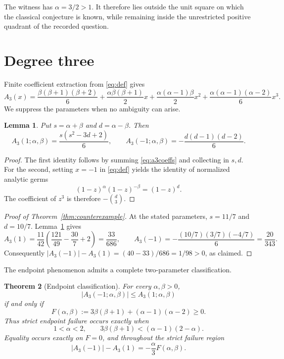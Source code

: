 \documentclass[a4paper]{amsart}
\newtheorem{theorem}{Theorem}[section]
\newtheorem{lemma}[theorem]{Lemma}
\theoremstyle{remark}
\begin{document}
The witness has \(\alpha=3/2>1\).  It therefore lies outside the unit square on which the classical conjecture is known, while remaining inside the unrestricted positive quadrant of the recorded question.

\section{Degree three}

Finite coefficient extraction from \eqref{eq:def} gives
\begin{equation}\label{eq:a3coeffs}
 A_3(x)=
 \frac{\beta(\beta+1)(\beta+2)}6
 +\frac{\alpha\beta(\beta+1)}2x
 +\frac{\alpha(\alpha-1)\beta}2x^2
 +\frac{\alpha(\alpha-1)(\alpha-2)}6x^3.
\end{equation}
We suppress the parameters when no ambiguity can arise.

\begin{lemma}\label{lem:sdforms}
Put \(s=\alpha+\beta\) and \(d=\alpha-\beta\).  Then
\[
 A_3(1;\alpha,\beta)=\frac{s(s^2-3d+2)}6,
 \qquad
 A_3(-1;\alpha,\beta)=-\frac{d(d-1)(d-2)}6.
\]
\end{lemma}

\begin{proof}
The first identity follows by summing \eqref{eq:a3coeffs} and collecting in \(s,d\).
For the second, setting \(x=-1\) in \eqref{eq:def} yields the identity of normalized analytic germs
\[
 (1-z)^\alpha(1-z)^{-\beta}=(1-z)^d.
\]
The coefficient of \(z^3\) is therefore \(-\binom d3\).
\end{proof}

\begin{proof}[Proof of Theorem~\ref{thm:counterexample}]
At the stated parameters, \(s=11/7\) and \(d=10/7\).  Lemma~\ref{lem:sdforms} gives
\[
 A_3(1)=\frac{11}{42}\left(\frac{121}{49}-\frac{30}{7}+2\right)
 =\frac{33}{686},
 \qquad
 A_3(-1)=-\frac{(10/7)(3/7)(-4/7)}6=\frac{20}{343}.
\]
Consequently
\(
 \lvert A_3(-1)\rvert-A_3(1)=(40-33)/686=1/98>0
\), as claimed.
\end{proof}

The endpoint phenomenon admits a complete two-parameter classification.

\begin{theorem}[Endpoint classification]\label{thm:endpoint}
For every \(\alpha,\beta>0\),
\[
 \lvert A_3(-1;\alpha,\beta)\rvert\leq A_3(1;\alpha,\beta)
\]
if and only if
\begin{equation}\label{eq:F}
 F(\alpha,\beta):=3\beta(\beta+1)+(\alpha-1)(\alpha-2)\geq0.
\end{equation}
Thus strict endpoint failure occurs exactly when
\[
 1<\alpha<2,
 \qquad
 3\beta(\beta+1)<(\alpha-1)(2-\alpha).
\]
Equality occurs exactly on \(F=0\), and throughout the strict failure region
\begin{equation}\label{eq:gap}
 \lvert A_3(-1)\rvert-A_3(1)=-\frac{\alpha}{3}F(\alpha,\beta).
\end{equation}
\end{theorem}
\end{document}
